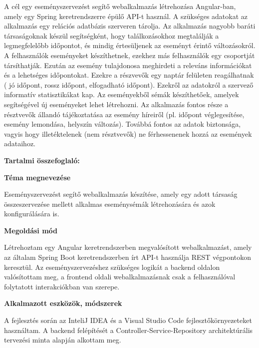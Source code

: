 \documentclass[a4paper,12pt]{report}
\theoremstyle{definition}
\theoremstyle{remark}
\begin{document}
A cél egy eseményszervezést segítő webalkalmazás létrehozása Angular-ban, amely egy Spring keretrendszerre épülő API-t használ. A szükséges adatokat az alkalmazás egy relációs adatbázis szerveren tárolja. Az alkalmazás nagyobb baráti társaságoknak készül segítségként, hogy találkozásokhoz megtalálják a legmegfelelőbb időpontot, és mindig értesüljenek az eseményt érintő változásokról. A felhasználók eseményeket készíthetnek, ezekhez más felhasználók egy csoportját társíthatják. Ezután az esemény tulajdonosa meghirdeti a releváns információkat és a lehetséges időpontokat. Ezekre a részvevők egy naptár felületen reagálhatnak ( jó időpont, rossz időpont, elfogadható időpont). Ezekről az adatokról a szervező informatív statisztikákat kap. Az eseményekből sémák készíthetőek, amelyek segítségével új eseményeket lehet létrehozni. Az alkalmazás fontos része a résztvevők állandó tájékoztatása az esemény híreiről (pl. időpont véglegesítése, esemény lemondása, helyszín változás). Továbbá fontos az adatok biztonsága, vagyis hogy illetéktelenek (nem résztvevők) ne férhessenenek hozzá az események adataihoz.

\newpage

{\Huge \bf Tartalmi összefoglaló:}

\bigskip

{\bf Téma megnevezése}

\medskip

Eseményszervezést segítő webalkalmazás készítése, amely egy adott társaság összeszervezése mellett alkalmas eseménysémák létrehozására és azok konfigurálására is.

\bigskip

{\bf Megoldási mód}

\medskip

Létrehoztam egy Angular keretrendszerben megvalósított webalkalmazást, amely az általam Spring Boot keretrendszerben írt API-t használja REST végpontokon keresztül. Az eseményszervezéshez szükséges logikát a backend oldalon valósítottam meg, a frontend oldali webalkalmazásnak csak a felhasználóval folytatott interakciókban van szerepe.

\bigskip

{\bf Alkalmazott eszközök, módszerek}

\medskip

A fejlesztés során az InteliJ IDEA és a Visual Studio Code fejlesztőkörnyezeteket használtam. A backend felépítését a Controller-Service-Repository architektúrális tervezési minta alapján alkottam meg.	
\end{document}
